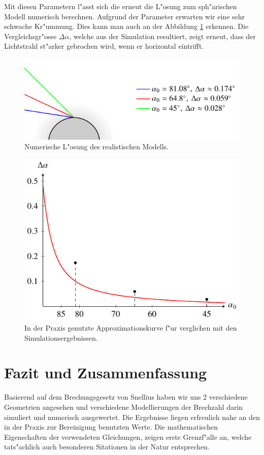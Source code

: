 \begin{refsection}
Mit diesen Parametern l"asst sich die erneut die L"osung zum sph"arischen Modell numerisch berechnen. 
Aufgrund der Parameter erwarten wir eine sehr schwache Kr"ummung. 
Dies kann man auch an der Abbildung \ref{fig:sphere_real} erkennen. 
Die Vergleichsgr"osse $\Delta \alpha$, welche aus der Simulation resultiert, zeigt erneut, dass der Lichtstrahl st"arker gebrochen wird, wenn er horizontal eintrifft. 

\begin{figure}
  \centering
  \includegraphics[scale=1]{licht/standalone/fig_real_simulation.pdf}
  \caption{Numerische L"osung des realistischen Modells. \label{fig:sphere_real} } 
\end{figure}

\begin{figure}
  \centering
  \includegraphics[scale=1]{licht/standalone/fig_real_comparison.pdf}
  \caption{In der Praxis genutzte Approximationskurve f"ur verglichen mit den Simulationsergebnissen. \label{fig:real_comparison}}
\end{figure}

\section{Fazit und Zusammenfassung}
Basierend auf dem Brechungsgesetz von Snellius haben wir uns 2 verschiedene Geometrien angesehen und verschiedene Modellierungen der Brechzahl darin simuliert und numerisch ausgewertet. 
Die Ergebnisse liegen erfreulich nahe an den in der Praxis zur Bereinigung benutzten Werte.
Die mathematischen Eigenschaften der verwendeten Gleichungen, zeigen erste Grenzf"alle an, welche tats"achlich auch besonderen Sitationen in der Natur entsprechen.

\printbibliography[heading=subbibliography]
\end{refsection}